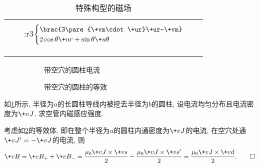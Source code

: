 \documentclass[hidelinks]{ctexart}
\begin{document}
\begin{longtable}[h]{|c|c|c|c|}
    &&&\\
    &&\+:r3{\+$\begin{cases}
        \brac{3\pare{\+vm\cdot\+ur}\+ur-\+vm}\\
        2\cos\theta\+ur+\sin\theta\+u\theta
    \end{cases}$\hspace{-1.5em}}&\\
    &&&\\
    &&&\\
    \hline
    \caption{特殊构型的磁场}
    \label{table:特殊构型的磁场}
\end{longtable}

\begin{figure}[ht]
    \centering
    \begin{subfigure}[b]{.45\textwidth}
        \centering
        \caption{带空穴的圆柱电流}
        \label{fig:带空穴的圆柱电流}
    \end{subfigure}
    \begin{subfigure}[b]{.45\textwidth}
        \centering
        \caption{带空穴的圆柱的等效}
        \label{fig:带空穴的圆柱的等效}
    \end{subfigure}
    \caption{}
    \label{fig:带空穴的圆柱电流例题}
\end{figure}

\begin{sample}
    \begin{ex}
        如\cref{fig:带空穴的圆柱电流}所示, 半径为$a$的长圆柱导线内被挖去半径为$b$的圆柱, 设电流均匀分布且电流密度为$\+vJ$, 求空管内磁感应强度.
    \end{ex}
    \begin{solution}
        考虑如\cref{fig:带空穴的圆柱的等效}的等效体, 即在整个半径为$a$的圆柱内通密度为$\+vJ$的电流, 在空穴处通$\+vJ'=-\+vJ$的电流, 则
        \[ \+vB = \+vB_+ + \+vB_- = \frac{\mu_0\+vJ\times\+vs}{2} - \frac{\mu_0\+vJ\times\+vs'}{2} = \frac{\mu_0\+vJ\times\+vd}{2}. \qedhere  \]
    \end{solution}
\end{sample}
\end{document}
